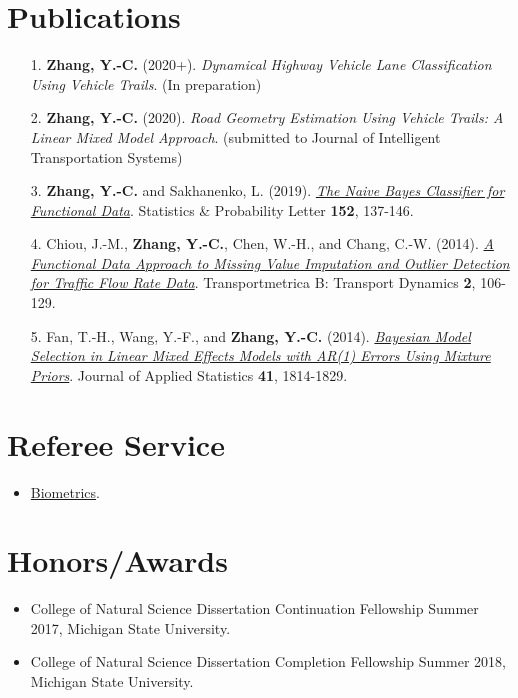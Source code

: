 \documentclass[a4paper,10pt,dvipdfmx]{article}
\begin{document}
\section*{Publications}
\begin{itemize}[noitemsep,nolistsep]
  \item[1.] \textbf{Zhang, Y.-C.} (2020+). \textit{Dynamical Highway Vehicle Lane Classification Using Vehicle Trails}. (In preparation)
  \item[2.] \textbf{Zhang, Y.-C.} (2020). \textit{Road Geometry Estimation Using Vehicle Trails: A Linear Mixed Model Approach}. (submitted to Journal of Intelligent Transportation Systems)
  \item[3.] \textbf{Zhang, Y.-C.} and Sakhanenko, L. (2019). \href{https://www.sciencedirect.com/science/article/pii/S0167715219301208}{\textit{The Naive Bayes Classifier for Functional Data}}. Statistics \& Probability Letter \textbf{152}, 137-146.
  \item[4.] Chiou, J.-M., \textbf{Zhang, Y.-C.}, Chen, W.-H., and Chang, C.-W. (2014). \href{http://www.tandfonline.com/doi/abs/10.1080/21680566.2014.892847}{\textit{A Functional Data Approach to Missing Value Imputation and Outlier Detection for Traffic Flow Rate Data}}. Transportmetrica B: Transport Dynamics \textbf{2}, 106-129.
  \item[5.] Fan, T.-H., Wang, Y.-F., and \textbf{Zhang, Y.-C.} (2014). \href{http://www.tandfonline.com/doi/abs/10.1080/02664763.2014.894001?journalCode=cjas20}{\textit{Bayesian Model Selection in Linear Mixed Effects Models with AR(1) Errors Using Mixture Priors}}. Journal of Applied Statistics \textbf{41}, 1814-1829.
\end{itemize}

\section*{Referee Service}
\begin{itemize}[noitemsep,nolistsep]
  \item \href{https://chris7462.github.io/BIOM_Reviewer_Certificate.pdf}{Biometrics}.
\end{itemize}

\section*{Honors/Awards}
\begin{itemize}[noitemsep,nolistsep]
  \item College of Natural Science Dissertation Continuation Fellowship Summer 2017, Michigan State University.
  \item College of Natural Science Dissertation Completion Fellowship Summer 2018, Michigan State University.
\end{itemize}
\end{document}
